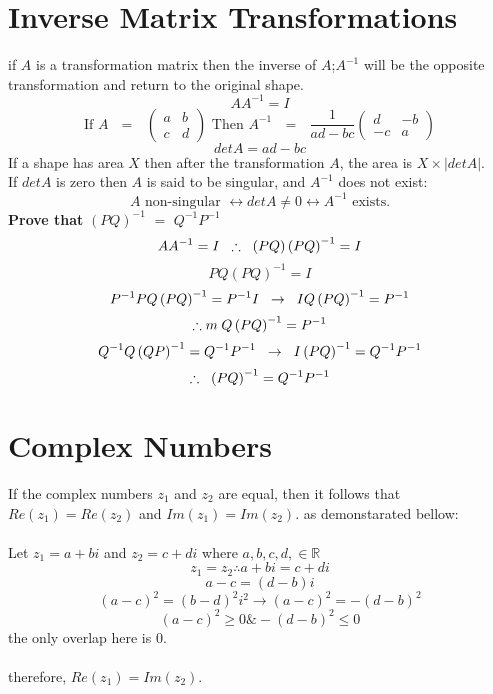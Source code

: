 \documentclass{article}
\begin{document}
\section{Inverse Matrix Transformations}
if \(A\) is a transformation matrix then the inverse of \(A\);\(A^{-1}\) will be the opposite transformation and return to the original shape.
\[AA^{-1}=I\]
\[\text{If \(A\) \(=\) }\left(\begin{array}{cc} a & b \\ c & d \end{array}\right) \text{  Then \(A^{-1}\) \(=\) } \frac{1}{ad-bc}\left(\begin{array}{cc} d & -b \\ -c & a \end{array}\right)\]
\[detA=ad-bc\]
If a shape has area \(X\) then after the transformation \(A\), the area is \(X \times |detA|\). \\
If \(detA\) is zero then \(A\) is said to be singular, and \(A^{-1}\) does not exist:
\[\text{\(A\) non-singular } \leftrightarrow detA\neq 0 \leftrightarrow A^{-1} \text{ exists.}\]
\textbf{Prove that} \(\left(PQ\right)^{-1}\) \(=\) \(Q^{-1}P^{-1}\)
\[AA^{-1}=I \hspace{0.2cm} \therefore \hspace{0.2cm} \left(PQ\right)\left(PQ\right)^{-1}=I\]
\[PQ\left(PQ\right)^{-1}=I\]
\[P^{-1}PQ\left(PQ\right)^{-1}=P^{-1}I \hspace{0.2cm} \rightarrow \hspace{0.2cm} IQ\left(PQ\right)^{-1}=P^{-1}\]
\[\therefore \hspace{0.2ccm} Q\left(PQ\right)^{-1}=P^{-1}\]
\[Q^{-1}Q\left(QP\right)^{-1}=Q^{-1}P^{-1} \hspace{0.2cm} \rightarrow \hspace{0.2cm} I\left(PQ\right)^{-1}=Q^{-1}P^{-1}\]
\[\therefore \hspace{0.2cm} \left(PQ\right)^{-1}=Q^{-1}P^{-1}\]
\section{Complex Numbers}
If the complex numbers \(z_1\) and \(z_2\) are equal, then it follows that \(Re\left(z_1\right) = Re\left(z_2\right)\) and \(Im\left(z_1\right) = Im\left(z_2\right)\). as demonstarated bellow: \\\\
Let \(z_1 = a+bi\) and \(z_2 = c+di\) where \(a,b,c,d, \in \mathbb{R}\)
\[z_1 = z_2 \therefore a+bi = c+di\]
\[a-c=\left(d-b\right)i\]
\[\left(a-c\right)^2=\left(b-d\right)^2i^2 \rightarrow \left(a-c\right)^2=-\left(d-b\right)^2\]
\[\left(a-c\right)^2\geq 0 \& -\left(d-b\right)^2\leq 0\]
the only overlap here is 0. \\\\
therefore, \(Re\left(z_1\right) = Im\left(z_2\right).\)
\end{document}
